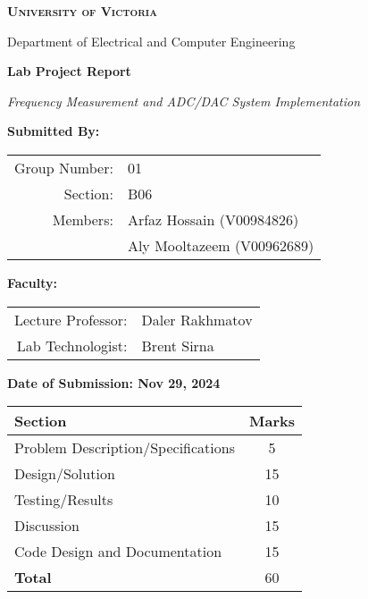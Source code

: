 \begin{titlepage}
\begin{center}

{\Large\bfseries\scshape University of Victoria \par}
{\large Department of Electrical and Computer Engineering \par}
\vspace{1.5cm}

{\Huge\bfseries Lab Project Report \par}
\vspace{0.4cm}
{\LARGE\textit{Frequency Measurement and ADC/DAC System Implementation} \par}
\vspace{1.2cm}

{\large\bfseries Submitted By: \par}
\vspace{0.4cm}
\begin{tabular}{rl}
Group Number: & 01 \\
Section: & B06 \\
Members: & Arfaz Hossain (V00984826) \\
         & Aly Mooltazeem (V00962689) \\
\end{tabular}
\vspace{1cm}

{\large\bfseries Faculty: \par}
\vspace{0.4cm}
\begin{tabular}{rl}
Lecture Professor: & Daler Rakhmatov \\
Lab Technologist: & Brent Sirna \\
\end{tabular}
\vspace{1cm}

{\large\bfseries Date of Submission: Nov 29, 2024 \par}
\vspace{1.5cm}

\begin{tabular}{|p{8cm}|c|}
\hline
\textbf{Section} & \textbf{Marks} \\
\hline
Problem Description/Specifications & 5 \\
Design/Solution & 15 \\
Testing/Results & 10 \\
Discussion & 15 \\
Code Design and Documentation & 15 \\
\hline
\textbf{Total} & 60 \\
\hline
\end{tabular}

\end{center}
\end{titlepage}

